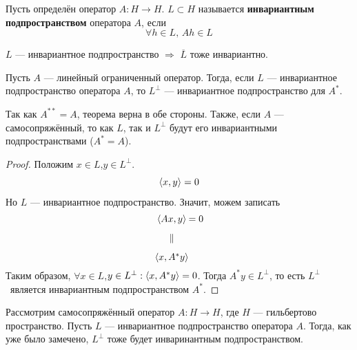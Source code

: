 \documentclass[12pt]{article}
\begin{document}
		\begin{defi}
			Пусть определён оператор $A: H \rightarrow H$. $L \subset H$ называется \textbf{инвариантным подпространством}
			оператора $A$, если 
			$$\forall h \in L,\, Ah \in L$$
		\end{defi}
	
		\begin{state}
			$L$ --- инвариантное подпространство $\Rightarrow$ $\overline L$ тоже инвариантно.
		\end{state}
		\begin{theorem}
			Пусть $A$ --- линейный ограниченный оператор. Тогда, если $L$ --- инвариантное подпространство оператора $A$, то 
			$L^{\perp}$ --- инвариантное подпространство для $A^*$.
		\end{theorem}
		Так как $A^{**} = A$, теорема верна в обе стороны. Также, если $A$ --- самосопряжённый, то как $L$, так и 
		$L^{\perp}$ будут его инвариантными подпространствами ($A^* = A$).
		\begin{proof}
			Положим $x \in L$,$y \in L^{\perp}$.
			$$\left\langle x, y \right\rangle = 0$$
			Но $L$ --- инвариантное подпространство. Значит, можем записать
			$$
			\begin{CD}
				\scal{Ax}{y} @. = 0 \\
				\parallel \\
				\scal{x}{A^*y}
			\end{CD}
			$$
			Таким образом, $\forall x \in L$,$y \in L^{\perp}: \left\langle x, A^*y \right\rangle = 0$. Тогда $A^*y \in L^{\perp}$, то есть
			$L^{\perp}$~является инвариантным подпространством $A^*$.
		\end{proof}
	
		Рассмотрим самосопряжённый оператор $A:H\rightarrow H$, где $H$ --- гильбертово пространство. Пусть $L$ --- инвариантное 
		подпространство оператора $A$. Тогда, как уже было замечено, $L^{\perp}$ тоже будет инваринантным подпространством.
	
\end{document}
